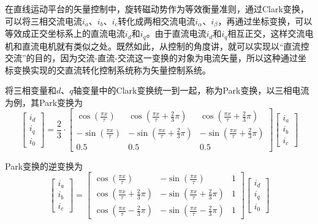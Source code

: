 在直线运动平台的矢量控制中，旋转磁动势作为等效衡量准则，通过Clark变换\cite{阮毅2016电力拖动自动控制系统}，可以将三相交流电流$i_a$、$i_b$、$i_c$转化成两相交流电流$i_\alpha$、$i_\beta$，再通过坐标变换，可以等效成正交坐标系上的直流电流$i_d$和$i_q$。由于直流电流$i_d$和$i_q$相互正交，这样交流电机和直流电机就有类似之处。既然如此，从控制的角度讲，就可以实现以“直流控交流”的目的，因为交流-直流-交流这一变换的对象为电流矢量，所以这种通过坐标变换实现的交直流转化控制系统称为矢量控制系统。


将三相变量和$d$、$q$轴变量中的Clark变换统一到一起，称为Park变换\cite{阮毅2016电力拖动自动控制系统}，以三相电流为例，其Park变换为
\begin{equation}
\begin{bmatrix}
i_{d} \\
i_{q} \\
i_{0}
\end{bmatrix}=\frac{2}{3}\cdot
\begin{bmatrix}
\cos \left(\frac{\pi x}{\tau}\right) & \cos \left(\frac{\pi x}{\tau}+\frac{2}{3} \pi\right) & \cos \left(\frac{\pi x}{\tau}+\frac{2}{3} \pi\right) \\
-\sin \left(\frac{\pi x}{\tau}\right) & -\sin \left(\frac{\pi x}{\tau}+\frac{2}{3} \pi\right) & -\sin \left(\frac{\pi x}{\tau}+\frac{2}{3} \pi\right) \\
0.5 & 0.5 & 0.5
\end{bmatrix}
\begin{bmatrix}
i_{a} \\
i_{b} \\
i_{c}
\end{bmatrix}
\end{equation}

Park变换的逆变换为
\begin{equation}
\begin{bmatrix}
	i_{a} \\
	i_{b} \\
	i_{c}
\end{bmatrix}=
\begin{bmatrix}
	\cos \left(\frac{\pi x}{\tau}\right) & -\sin \left(\frac{\pi x}{\tau}\right) & 1 \\
	\cos \left(\frac{\pi x}{\tau}+\frac{2}{3} \pi\right) & -\sin \left(\frac{\pi x}{\tau}+\frac{2}{3} \pi\right) & 1 \\
	\cos \left(\frac{\pi x}{\tau}-\frac{2}{3} \pi\right) & -\sin \left(\frac{\pi x}{\tau}-\frac{2}{3} \pi\right) & 1
\end{bmatrix}
\begin{bmatrix}
	i_{d} \\
	i_{q} \\
	i_{0}
\end{bmatrix}
\end{equation}

